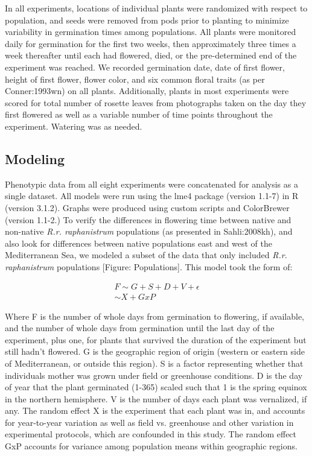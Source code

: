 \documentclass[twocolumn]{bmcart}%
\begin{document}
In all experiments, locations of individual plants were randomized with respect to population, and seeds were removed from pods prior to planting to minimize variability in germination times among populations. All plants were monitored daily for germination for the first two weeks, then approximately three times a week thereafter until each had flowered, died, or the pre-determined end of the experiment was reached. We recorded germination date, date of first flower, height of first flower, flower color, and six common floral traits (as per {Conner:1993wn}) on all plants. Additionally, plants in most experiments were scored for total number of rosette leaves from photographs taken on the day they first flowered as well as a variable number of time points throughout the experiment. Watering was as needed.

\subsection*{Modeling}

Phenotypic data from all eight experiments were concatenated for analysis as a single dataset. All models were run using the lme4 package (version 1.1-7) in R (version 3.1.2). Graphs were produced using custom scripts and ColorBrewer (version 1.1-2.) 
To verify the differences in flowering time between native and non-native \textit{R.r. raphanistrum} populations (as presented in {Sahli:2008kh}), and also look for differences between native populations east and west of the Mediterranean Sea, we modeled a subset of the data that only included \textit{R.r. raphanistrum} populations [Figure: Populations]. This model took the form of:

\begin{gather*}
F \sim G + S + D + V + \epsilon\\
%
%
%
\sim X + G x P
\end{gather*}

Where F is the number of whole days from germination to flowering, if available, and the number of whole days from germination until the last day of the experiment, plus one, for plants that survived the duration of the experiment but still hadn’t flowered. G is the geographic region of origin (western or eastern side of Mediterranean, or outside this region). S is a factor representing whether that individuals mother was grown under field or greenhouse conditions. D is the day of year that the plant germinated (1-365) scaled such that 1 is the spring equinox in the northern hemisphere. V is the number of days each plant was vernalized, if any.  The random effect X is the experiment that each plant was in, and accounts for year-to-year variation as well as field vs. greenhouse and other variation in experimental protocols, which are confounded in this study. The random effect GxP accounts for variance among population means within geographic regions.
\end{document}
